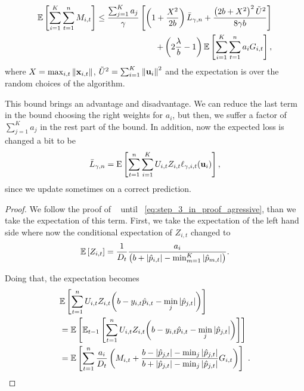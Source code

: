 {\begin{theorem}
\begin{displaymath}
\begin{split}
\mathbb{E}\left[ \sum_{i=1}^{K}\sum_{t=1}^{n}{M_{i,t}} \right]
\le\frac{\sum_{j=1}^Ka_{j}}{\gamma}\left[{\left(1+\frac{X^2}{2b} \right){\bar L}_{\gamma,n}+
\frac{\left({2b+X^2}\right)^2\tilde{U}^2}{8{\gamma}b}}\right]\\ 
+
\left({2\frac{\lambda}{b}-1}\right)\mathbb{E}\left[{\sum_{i=1}^{K}\sum_{t=1}^{n}{a_{i}G_{i,t}}}\right],
\label{bound_FO_SHAMPO_prior}
\end{split}
\end{displaymath}
 where $X=\max_{i,t}\Vert\mathbf{x}_{i,t}\Vert$,
$\tilde{U}^2=\sum_{i=1}^{K}\left\Vert {\mathbf{u}_{i}} \right\Vert^2$ and the expectation is over the
random choices of the algorithm.
\label{thm:FO_bound_aggressive_prior}
\end{theorem} 
This bound brings an advantage and disadvantage. We can reduce the last term in the bound choosing
 the right weights for $a_i$, but then, we suffer a factor of $\sum_{j=1}^Ka_{j}$ in the rest part of the bound. In 
 addition, now the expected loss is changed a bit to be 
 \begin{equation*}
\bar{L}_{\gamma,n}={\rm E}\left[{\sum_{t=1}^n \sum_{i=1}^{K}{U_{i,t}Z_{i,t}\ell_{\gamma,i,t}(\mathbf{u}_{i})}}\right],
 \end{equation*}
 since we update sometimes on a correct prediction.  
\\

\begin{proof}
We follow the proof of ~ until ~\eqref{eq:step_3_in_proof_agressive}, 
than we take the expectation of this term. First, we take the expectation of the left hand side 
where now the conditional expectation of $Z_{i,t}$ changed to 
\[
\mathbb{E}\left[{Z_{i,t}}\right]=\frac{1}{D_{t}}\frac{a_{i}}{\left({b+\left\vert{\hat{p}_{i,t}}\right\vert-\min_{m=1}^K\left\vert{\hat{p}_{m,t}}\right\vert}\right)}.
\]

\noindent
Doing that, the expectation becomes
\begin{align*}
\begin{split}
&\mathbb{E}\left[{\sum_{t=1}^{n}U_{i,t}Z_{i,t}{\left({b-y_{i,t}\hat{p}_{i,t}-\min_{j}{\left\vert{ \hat{p}_{j,t}}\right\vert}}\right)}}\right] \\
        &=\mathbb{E}\left[{\mathbb{E}_{t-1}\left[{{\sum_{t=1}^{n}{U_{i,t}Z_{i,t}{\left(b-y_{i,t}\hat{p}_{i,t}-\min_{j}{\left\vert{\hat{p}_{j,t}}\right\vert}\right)}}}}\right]}\right] \\
&=\mathbb{E}\left[{\sum_{t=1}^{n}{\frac{a_{i}}{D_{t}}\left({M_{i,t}+\frac{b-\left\vert{\hat{p}_{j,t}}\right\vert-\min_{j}{\left\vert{\hat{p}_{j,t}}\right\vert }}{b+\left\vert{\hat{p}_{j,t}}\right\vert-\min_{j}{\left\vert{\hat{p}_{j,t}}\right\vert}}G_{i,t} }\right)}}\right]~.
\end{split}
\end{align*}


\end{proof}}
